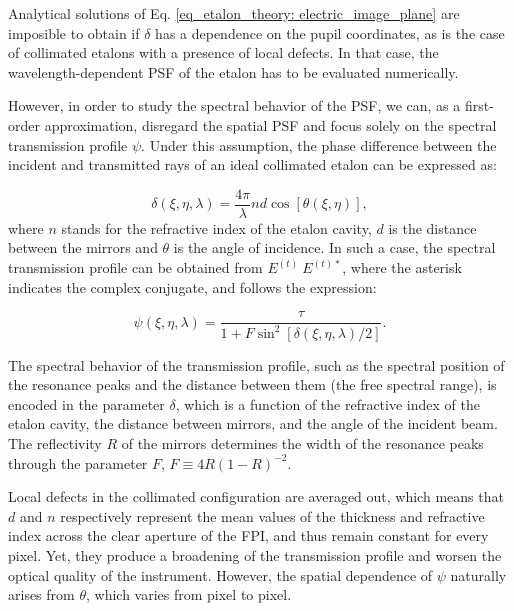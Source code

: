 Analytical solutions of Eq. \eqref{eq_etalon_theory: electric_image_plane} are imposible to obtain if $\delta$ has a dependence on the pupil coordinates, as is the case of collimated etalons with a presence of local defects. In that case, the wavelength-dependent PSF of the etalon has to be evaluated numerically. 

However, in order to study the spectral behavior of the PSF, we can, as a first-order approximation, disregard the spatial PSF and focus solely on the spectral transmission profile $\psi$. Under this assumption, the phase difference between the incident and transmitted rays of an ideal collimated etalon can be expressed as:  

\begin{equation}
  \delta (\xi, \eta, \lambda) = \frac{4\pi}{\lambda}nd\cos [\theta(\xi, \eta)],
  \label{eq_etalon_theory: collimated_delta}
\end{equation}
where $n$ stands for the refractive index of the etalon cavity, $d$ is the distance between the mirrors and $\theta$ is the angle of incidence. In such a case, the spectral transmission profile can be obtained from $E ^{(t)}\ E^{(t)*}$, where the asterisk indicates the complex conjugate, and follows the expression: 

\begin{equation}
  \psi\left(\xi, \eta, \lambda \right) = \frac{\tau}{1 + F \sin ^2 [\delta(\xi, \eta, \lambda) / 2]}.
  \label{eq_eta_theory : Collimated_profile}
\end{equation}

The spectral behavior of the transmission profile, such as the spectral position of the resonance peaks and the distance between them (the free spectral range), is encoded in the parameter $\delta$, which is a function of the refractive index of the etalon cavity, the distance between mirrors, and the angle of the incident beam. The reflectivity $R$ of the mirrors determines the width of the resonance peaks through the parameter $F$, $F \equiv 4R (1 - R )^{-2}$.

Local defects in the collimated configuration are averaged out, which means that $d$ and $n$ respectively represent the mean values of the thickness and refractive index across the clear aperture of the FPI, and thus remain constant for every pixel. Yet, they produce a broadening of the transmission profile and worsen the optical quality of the instrument. However, the spatial dependence of $\psi$ naturally arises from $\theta$, which varies from pixel to pixel. 

